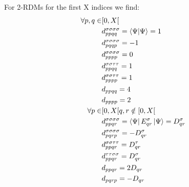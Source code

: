 For 2-RDMs for the first X indices we find:
\begin{align}
  \forall p,q \in & [0,X[ \\
  & d^{\sigma \sigma \sigma \sigma}_{ppqq} = \braket{\Psi}{\Psi} = 1 \\
  & d^{\sigma \sigma \sigma \sigma}_{pqqp} = - 1 \\
  & d^{\sigma \sigma \sigma \sigma}_{pppp} = 0 \\
  & d^{\sigma \sigma \tau \tau}_{ppqq} = 1 \\
  & d^{\sigma \sigma \tau \tau}_{pppp} = 1 \\
  & d_{ppqq} = 4 \\
  & d_{pppp} = 2 \\
  \forall p \in & [0, X[ q,r \notin [0, X[ \\
  & d^{\sigma \sigma \sigma \sigma}_{ppqr} = \bra{\Psi} E_{qr}^{\sigma} \ket{\Psi} = D_{qr}^{\sigma} \\
  & d^{\sigma \sigma \sigma \sigma}_{pqrp} = - D_{qr}^{\sigma} \\
  & d^{\sigma \sigma \tau \tau}_{ppqr} = D_{qr}^{\tau} \\
  & d^{\tau \tau \sigma \sigma}_{ppqr} = D_{qr}^{\sigma} \\
  & d_{ppqr} = 2 D_{qr} \\
  & d_{pqrp} = - D_{qr}
\end{align}

